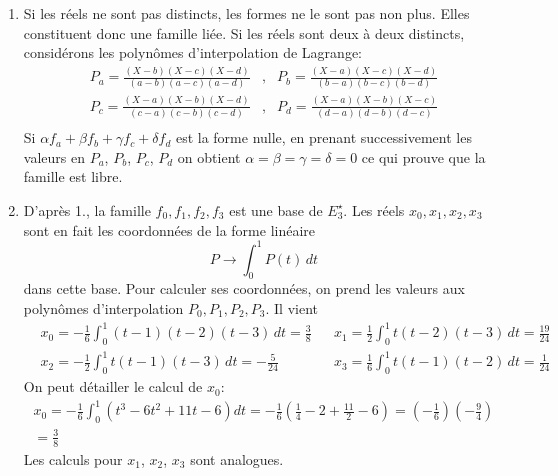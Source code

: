 \begin{enumerate}
\item Si les réels ne sont pas distincts, les formes ne le sont pas non plus. Elles constituent donc une famille liée. Si les réels sont deux à deux distincts, considérons les polynômes d'interpolation de Lagrange:
\begin{align*}
P_{a}=\frac{(X-b)(X-c)(X-d)}{(a-b)(a-c)(a-d)} &,&
P_{b}=\frac{(X-a)(X-c)(X-d)}{(b-a)(b-c)(b-d)}\\
P_{c}=\frac{(X-a)(X-b)(X-d)}{(c-a)(c-b)(c-d)} &,&
P_{d}=\frac{(X-a)(X-b)(X-c)}{(d-a)(d-b)(d-c)}\\
\end{align*}
Si $\alpha f_{a}+\beta f_{b}+\gamma f_{c}+\delta f_{d}$ est la forme nulle, en prenant successivement les valeurs en $P_{a}$, $P_{b}$, $P_{c}$, $P_{d}$ on obtient $\alpha=\beta=\gamma=\delta=0$ ce qui prouve que la famille est libre.
\item D'après 1., la famille $f_{0}, f_{1}, f_{2}, f_{3}$ est une base de $E_{3}^{\star}$.\newline
Les réels $x_{0}, x_{1}, x_{2}, x_{3}$ sont en fait les coordonnées de la forme linéaire 
\begin{displaymath}
P \rightarrow \int_{0}^{1}P(t)\,dt 
\end{displaymath}
dans cette base. Pour calculer ses coordonnées, on prend les valeurs aux polynômes d'interpolation $P_{0}, P_{1}, P_{2}, P_{3}$. Il vient
\begin{align*}
&x_{0}=-\frac{1}{6}\int_{0}^{1}(t-1)(t-2)(t-3)\,dt=\frac{3}{8} & &
x_{1}=\frac{1}{2}\int_{0}^{1}t(t-2)(t-3)\,dt=\frac{19}{24}\\
&x_{2}=-\frac{1}{2}\int_{0}^{1}t(t-1)(t-3)\,dt=-\frac{5}{24}   & &
x_{3}=\frac{1}{6}\int_{0}^{1}t(t-1)(t-2)\,dt=\frac{1}{24}
\end{align*}
On peut détailler le calcul de $x_0$:
\begin{multline*}
x_0 = -\frac{1}{6}\int_0^1\left( t^3 - 6t^2 +11t -6\right)dt 
= -\frac{1}{6}\left( \frac{1}{4} - 2  + \frac{11}{2} -6\right) = \left( -\frac{1}{6}\right) \left( -\frac{9}{4}\right)\\  = \frac{3}{8}
\end{multline*}
Les calculs pour $x_1$, $x_2$, $x_3$ sont analogues.


\end{enumerate}
